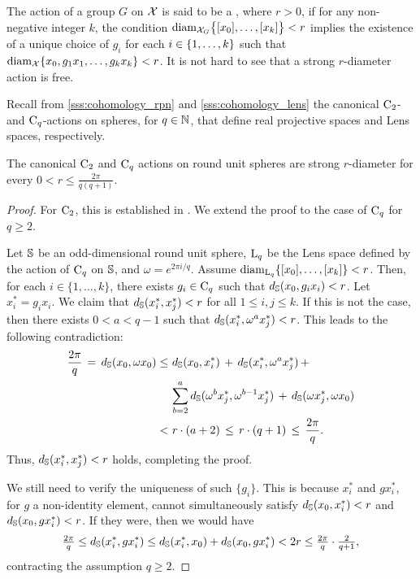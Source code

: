 \subsubsection{}\label{sss:strong_r_action}

The action of a group $G$ on $\cX$ is said to be a , where $r > 0$, if for any non-negative integer $k$, the condition $\diam_{\cX_G}\set[\big]{[x_0],\dots,[x_k]} < r$ implies the existence of a unique choice of $g_i$ for each $i \in \set{1,\dots,k}$ such that $\diam_{\cX}\set{x_0, g_1x_1, \dots, g_kx_k} < r$.
It is not hard to see that a strong $r$-diameter action is free.

Recall from \cref{sss:cohomology_rpn} and \cref{sss:cohomology_lens} the canonical $\rC_2$- and $\rC_q$-actions on spheres, for $q \in \N$, that define real projective spaces and Lens spaces, respectively. 

\medskip\lemma
The canonical $\rC_2$ and $\rC_q$ actions on round unit spheres are strong $r$-diameter for every $0 < r \leq \tfrac{2\pi}{q(q+1)}$.

\begin{proof}
    For $\rC_2$, this is established in \cite[Cor.~4.3]{adams2022metric}. We extend the proof to the case of $\rC_q$ for \(q \geq 2\).

    Let $\bS$  be an odd-dimensional round unit sphere, $\rL_q$ be the Lens space defined by the action of \(\rC_q\) on \(\bS\), and $\omega = e^{2\pi i/q}$.
	Assume $\diam_{\rL_q}\{[x_0], \dots, [x_k]\} < r$.
	Then, for each $i \in \{1, \dots, k\}$, there exists $g_i \in \rC_q$ such that $d_{\bS}(x_0, g_i x_i) < r$. Let $x_i^* = g_i x_i$. We claim that $d_{\bS}(x_i^*, x_j^*) < r$ for all $1 \leq i, j \leq k$.
    If this is not the case, then there exists $0 < a < q-1$ such that $d_{\bS}(x_i^*, \omega^a x_j^*) < r$.
    This leads to the following	contradiction:
    \begin{align*}
    \frac{2\pi}{q} \,=\, d_{\bS}(x_0, \omega x_0) 
    \leq\, & \, d_{\bS}(x_0, x_i^*) \, + \, d_{\bS}(x_i^*, \omega^a x_j^*) \, + \, \\
    & \sum_{b=2}^a d_{\bS}(\omega^b x_j^*, \omega^{b-1} x_j^*) \, + \, d_{\bS}(\omega x_j^*, \omega x_0)\\
    < \, & \, r \cdot (a + 2) \, \leq \, r \cdot (q + 1) \, \leq \, \frac{2\pi}{q}.
    \end{align*}
    Thus, $d_{\bS}(x_i^*, x_j^*) < r$ holds, completing the proof.

    We still need to verify the uniqueness of such $\{g_i\}$.
    This is because $x_i^*$ and $gx_i^*$, for $g$ a non-identity element, cannot simultaneously satisfy $d_{\bS}(x_0, x_i^*) < r$ and $d_{\bS}(x_0, gx_i^*) < r$.
    If they were, then we would have
    \[\tfrac{2\pi}{q} \leq d_{\bS}(x_i^*, gx_i^*) \leq d_{\bS}(x_i^*, x_0) + d_{\bS}(x_0, gx_i^*) < 2r \leq \tfrac{2\pi}{q} \cdot \tfrac{2}{q+1},
    \]
    contracting	the assumption $q \geq 2$.
\end{proof}

